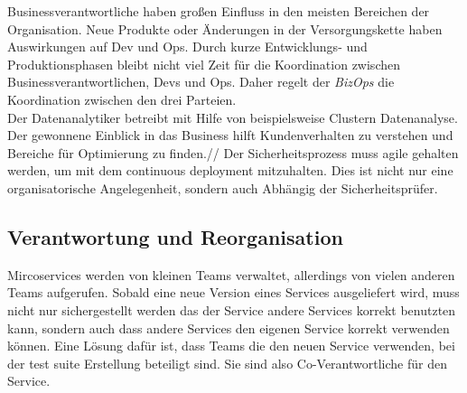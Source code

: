 Businessverantwortliche haben großen Einfluss in den meisten Bereichen der Organisation. Neue Produkte oder Änderungen in der Versorgungskette haben Auswirkungen auf Dev und Ops. Durch kurze Entwicklungs- und Produktionsphasen bleibt nicht viel Zeit für die Koordination zwischen Businessverantwortlichen, Devs und Ops. Daher regelt der \textit{BizOps} die Koordination zwischen den drei Parteien.\\
Der Datenanalytiker betreibt mit Hilfe von beispielsweise Clustern Datenanalyse. Der gewonnene Einblick in das Business hilft Kundenverhalten zu verstehen und Bereiche für Optimierung zu finden.//
Der Sicherheitsprozess muss agile gehalten werden, um mit dem continuous deployment mitzuhalten. Dies ist nicht nur eine organisatorische Angelegenheit, sondern auch Abhängig der Sicherheitsprüfer.

\subsection{Verantwortung und Reorganisation}

Mircoservices werden von kleinen Teams verwaltet, allerdings von vielen anderen Teams aufgerufen. Sobald eine neue Version eines Services ausgeliefert wird, muss nicht nur sichergestellt werden das der Service andere Services korrekt benutzten kann, sondern auch dass andere Services den eigenen Service korrekt verwenden können. Eine Lösung dafür ist, dass Teams die den neuen Service verwenden, bei der test suite Erstellung beteiligt sind. Sie sind also Co-Verantwortliche für den Service. 

